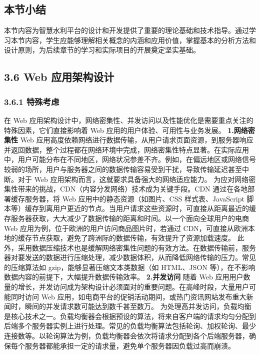 \subsection{本节小结}\label{ux672cux8282ux5c0fux7ed3-1}
本节内容为智慧水利平台的设计和开发提供了重要的理论基础和技术指导。通过学习本节内容，学生应能够理解相关概念的内涵和应用价值，掌握基本的分析方法和设计原则，为后续章节的学习和实际项目的开展奠定坚实基础。 \subsection{3.6 Web
应用架构设计}\label{web-ux5e94ux7528ux67b6ux6784ux8bbeux8ba1} \subsubsection{3.6.1 特殊考虑}\label{ux7279ux6b8aux8003ux8651} 在 Web
应用架构设计中，网络密集性、并发访问以及性能优化是需要重点关注的特殊因素，它们直接影响着 Web 应用的用户体验、可用性与业务发展。 \textbf{1.网络密集性} Web
应用高度依赖网络进行数据传输，从用户请求页面资源，到服务器响应并返回数据，整个过程都在网络环境中完成，网络密集性特点显著。在实际应用中，用户可能分布在不同地区，网络状况参差不齐。例如，在偏远地区或网络信号较弱的场所，用户与服务器之间的数据传输容易受到干扰，导致传输延迟甚至中断。对于
Web 应用架构而言，这就要求具备强大的网络适应能力。 为应对网络密集性带来的挑战，CDN（内容分发网络）技术成为关键手段。CDN 通过在各地部署缓存服务器，将 Web 应用中的静态资源（如图片、CSS 样式表、JavaScript
脚本等）缓存到离用户更近的节点。当用户请求这些资源时，可直接从距离最近的缓存服务器获取，大大减少了数据传输的距离和时间。以一个面向全球用户的电商 Web 应用为例，位于欧洲的用户访问商品图片时，若通过
CDN，可直接从欧洲本地的缓存节点获取，避免了跨洲际的数据传输，有效提升了资源加载速度。
此外，采用数据压缩技术也是缓解网络密集性问题的有效方法。在数据传输前，服务器对要发送的数据进行压缩处理，减少数据体积，从而降低网络传输的压力。常见的压缩算法如 gzip，能够显著压缩文本类数据（如 HTML、JSON
等），在不影响数据内容的前提下，大幅提升数据传输效率。 \textbf{2.并发访问} 随着 Web 应用用户数量的增长，并发访问成为架构设计必须面对的重要问题。在高峰时段，大量用户可能同时访问 Web
应用，如电商平台的促销活动期间，或热门资讯网站发布重大新闻时，瞬间的并发请求数可能达到数千甚至数万。
为处理高并发访问，负载均衡是核心技术之一。负载均衡器会根据预设的算法，将来自客户端的请求均匀分配到后端多个服务器实例上进行处理。常见的负载均衡算法包括轮询、加权轮询、最少连接数等。以轮询算法为例，负载均衡器会依次将请求分配到各个后端服务器，确保每个服务器都能承担一定的请求量，避免单个服务器因负载过高而崩溃。
